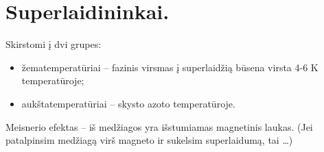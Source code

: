 \section{Superlaidininkai.}
Skirstomi į dvi grupes:
\begin{itemize}
  \item žematemperatūriai – fazinis virsmas į superlaidžią būsena virsta
    4-6 K temperatūroje;
  \item aukštatemperatūriai – skysto azoto temperatūroje.
\end{itemize}
Meisnerio efektas – iš medžiagos yra išstumiamas magnetinis laukas.
(Jei patalpinsim medžiagą virš magneto ir sukelsim superlaidumą,
tai …)
